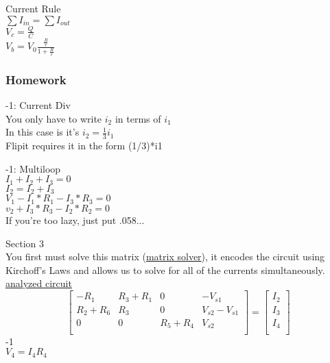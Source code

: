 \documentclass{article}
\begin{document}
\noindent
Current Rule \\
$\sum I_{in} = \sum I_{out}$ \\
$V_c = \frac{Q}{C}$ \\
$V_b = V_0 \frac{\frac{R}{r}}{1+ \frac{R}{r}}$

\subsubsection{Homework}

-1: Current Div \\
You only have to write $i_2$ in terms of $i_1$ \\
In this case is it's $i_2 = \frac{1}{3}i_1$ \\
Flipit requires it in the form (1/3)*i1

\vspace{2mm}

-1: Multiloop \\
$I_1 + I_2 + I_3 = 0$ \\
$I_2 = I_2 + I_3$ \\ 
$V_1 - I_1*R_1 - I_3*R_3 = 0$ \\
$v_2 + I_3*R_3 - I_2*R_2 = 0$ \\
If you're too lazy, just put .058...

\vspace{2mm}


\noindent
Section 3 \\
You first must solve this matrix (\href{https://matrixcalc.org/en/slu.html}{matrix solver}), it encodes the circuit using Kirchoff's Laws and allows us to solve for all of the currents simultaneously. \\
\href{https://i.imgur.com/vFWyAQU.png}{analyzed circuit} 
\[
    \left[\begin{array}{ccc|c}
    -R_1 & R_3+R_1 & 0 & -V_{s1} \\
    R_2+R_6 & R_3 & 0 & V_{s2}-V_{s1} \\
    0 & 0 & R_5+R_4 & V_{s2} \\
    \end{array}\right]=
    \begin{bmatrix}
      I_2\\I_3\\I_4\\
    \end{bmatrix}
\]
-1 \\
$V_4=I_4R_4$ \\
\vspace{2mm}
\end{document}
